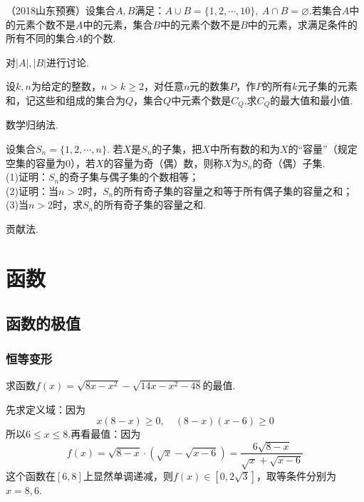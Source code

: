 \documentclass[cn,hazy,black,10pt,normal]{elegantnote}
\begin{document}
\begin{problem} %
	（2018山东预赛）设集合$A,B$满足：$A \cup B = \{ 1,2,\cdots ,10 \}, ~A \cap B = \varnothing$.若集合$A$中的元素个数不是$A$中的元素，集合$B$中的元素个数不是$B$中的元素，求满足条件的所有不同的集合$A$的个数.
\end{problem}
\begin{hint}
	对$|A|,|B|$进行讨论.
\end{hint}

\begin{problem} %
	设$k,n$为给定的整数，$n>k \geq 2$，对任意$n$元的数集$P$，作$P$的所有$k$元子集的元素和，记这些和组成的集合为$Q$，集合$Q$中元素个数是$C_Q$.求$C_Q$的最大值和最小值.
\end{problem}
\begin{hint}
	数学归纳法.
\end{hint}

\begin{problem} %
	设集合$S_n=\{1,2, \cdots ,n\}$. 若$X$是$S_n$的子集，把$X$中所有数的和为$X$的“容量”（规定空集的容量为$0$），若$X$的容量为奇（偶）数，则称$X$为$S_n$的奇（偶）子集. \\
    (1)证明：$S_n$的奇子集与偶子集的个数相等；\\
    (2)证明：当$n>2$时，$S_n$的所有奇子集的容量之和等于所有偶子集的容量之和；\\
    (3)当$n>2$时，求$S_n$的所有奇子集的容量之和.
\end{problem}
\begin{hint}
	贡献法.
\end{hint}
 
\chapter{函数}

\section{函数的极值}

\subsection{恒等变形}

\begin{problem} %
	求函数$f(x)=\sqrt{8x-x^2}-\sqrt{14x-x^2-48}$的最值.
\end{problem}
\begin{solution}
	先求定义域：因为$$x(8-x) \geq 0, \quad (8-x)(x-6) \geq 0$$
	所以$6 \leq x \leq 8$.再看最值：因为$$f(x)=\sqrt{8-x} \cdot (\sqrt{x} - \sqrt{x-6}) = \frac{6\sqrt{8-x}}{\sqrt{x} + \sqrt{x-6}}$$
	这个函数在$[6,8]$上显然单调递减，则$f(x) \in [0,2\sqrt{3}]$，取等条件分别为$x=8,6$.
\end{solution}
\end{document}

